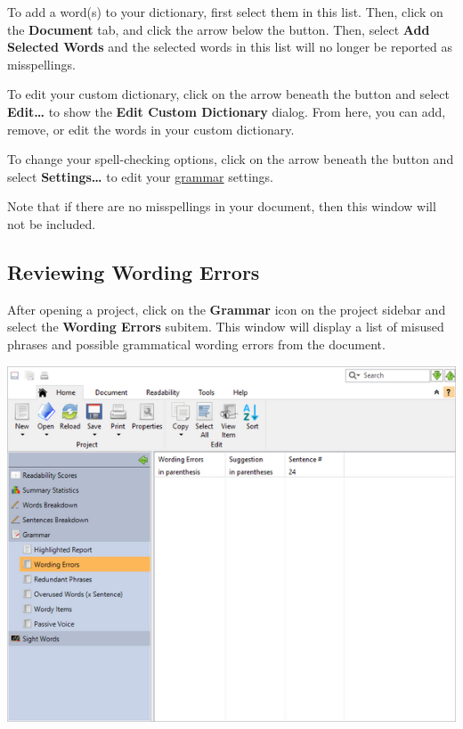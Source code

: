 \documentclass[
]{book}
\theoremstyle{definition}
\theoremstyle{definition}
\theoremstyle{definition}
\theoremstyle{definition}
\theoremstyle{remark}
\begin{document}
To add a word(s) to your dictionary, first select them in this list. Then, click on the \textbf{Document} tab, and click the arrow below the  button. Then, select \textbf{Add Selected Words} and the selected words in this list will no longer be reported as misspellings.

To edit your custom dictionary, click on the arrow beneath the  button and select \textbf{Edit\ldots{}} to show the \textbf{Edit Custom Dictionary} dialog. From here, you can add, remove, or edit the words in your custom dictionary.

To change your spell-checking options, click on the arrow beneath the  button and select \textbf{Settings\ldots{}} to edit your \protect\hyperlink{options-grammar}{grammar} settings.

Note that if there are no misspellings in your document, then this window will not be included.

\hypertarget{reviewing-wording-errors}{%
\subsection*{Reviewing Wording Errors}\label{reviewing-wording-errors}}

After opening a project, click on the \textbf{Grammar} icon on the project sidebar and select the \textbf{Wording Errors} subitem. This window will display a list of misused phrases and possible grammatical wording errors from the document.

\includegraphics{Images/wordingerrors.png}
\end{document}
